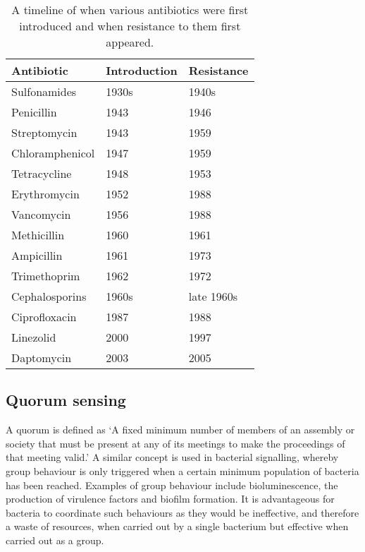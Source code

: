 \begin{table}[H]
  \centering
\begin{tabular}{|p{}|p{}|p{}|}
\hline  
\textbf{Antibiotic} & \textbf{Introduction} & \textbf{Resistance} \\ 
\hline
Sulfonamides & 1930s & 1940s \\ 
\hline 
Penicillin & 1943 & 1946 \\ 
\hline 
Streptomycin & 1943 & 1959 \\ 
\hline 
Chloramphenicol & 1947 & 1959 \\ 
\hline 
Tetracycline & 1948 & 1953 \\ 
\hline 
Erythromycin & 1952 & 1988 \\ 
\hline 
Vancomycin & 1956 & 1988 \\ 
\hline 
Methicillin & 1960 & 1961 \\ 
\hline 
Ampicillin & 1961 & 1973 \\ 
\hline 
Trimethoprim & 1962 & 1972 \\
\hline 
Cephalosporins & 1960s & late 1960s \\
\hline 
Ciprofloxacin & 1987 & 1988 \\
\hline 
Linezolid & 2000 & 1997 \\
\hline
Daptomycin & 2003 & 2005\\
\hline
\end{tabular}
\caption{A timeline of when various antibiotics were first introduced and when resistance to them first appeared\cite{Clatworthy2007,Palumbi2001,Ogle1988,Huovinen2001,Birmingham2003,Lee2007}.\label{tbl:AB_timeline}} 
\end{table}






\subsection{Quorum sensing}

A quorum is defined as `A fixed minimum number of members of an assembly or society that must be present at any of its meetings to make the proceedings of that meeting valid.' \cite{Dictionary}  
A similar concept is used in bacterial signalling, whereby group behaviour is only triggered when a certain minimum population of bacteria has been reached. Examples of group behaviour include bioluminescence, the  production of  virulence factors and biofilm formation.  
It is advantageous for bacteria to coordinate such behaviours as they would be ineffective, and therefore a waste of resources, when carried out by a single bacterium but effective when carried out as a group.

